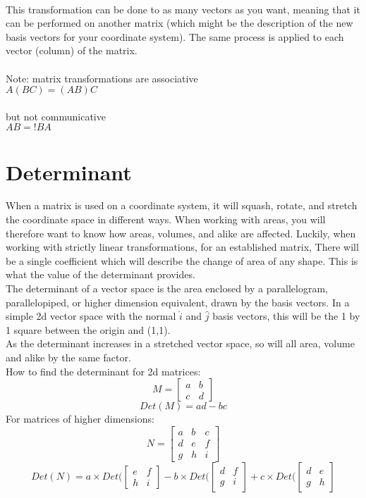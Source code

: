 \documentclass{article}
\begin{document}
\\
This transformation can be done to as many vectors as you want, meaning that it can be performed on another matrix (which might be the description of the new basis vectors for your coordinate system).
The same process is applied to each vector (column) of the matrix.
\\ \\
Note: matrix transformations are associative
\\
$A(BC) = (AB)C$
\\ \\
but not communicative
\\
$AB =! BA$
\section{Determinant}
When a matrix is used on a coordinate system, it will squash, rotate, and stretch the coordinate space in different ways. When working with areas, you will therefore want to know how areas, volumes, and alike are affected. Luckily, when working with strictly linear transformations, for an established matrix, There will be a single coefficient which will describe the change of area of any shape. This is what the value of the determinant provides.\\The determinant of a vector space is the area enclosed by a parallelogram, parallelopiped, or higher dimension equivalent, drawn by the basis vectors. In a simple 2d vector space with the normal $\hat{i}$ and $\hat{j}$ basis vectors, this will be the 1 by 1 square  between the origin and (1,1). \\As the determinant increases in a stretched vector space, so will all area, volume and alike by the same factor.
\\ How to find the determinant for 2d matrices:
\[ M = \begin{bmatrix}
    a&b\\
    c&d
    \end{bmatrix}\]
\[ Det(M) = ad - bc\]
For matrices of higher dimensions:
\[ N = \begin{bmatrix}
    a&b&c\\
    d&e&f\\
    g&h&i
\end{bmatrix}\]
\[ Det(N) = a \times Det(\begin{bmatrix}
    e&f\\
    h&i
\end{bmatrix} - b \times Det(\begin{bmatrix}
    d&f\\
    g&i
\end{bmatrix} + c \times Det(\begin{bmatrix}
    d&e\\
    g&h
\end{bmatrix}\]
\end{document}
